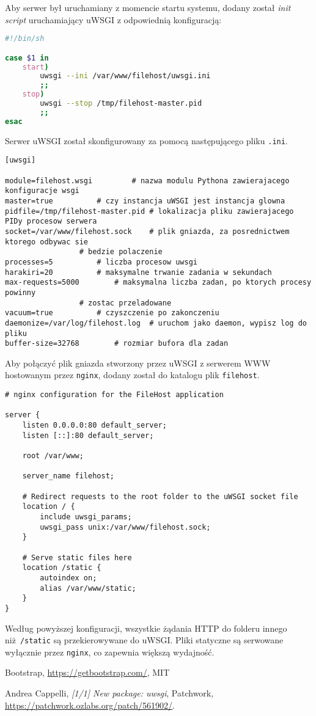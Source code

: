 \documentclass[10pt,a4paper]{article}
\begin{document}
Aby serwer był uruchamiany z momencie startu systemu, dodany został \emph{init script}
uruchamiający uWSGI z odpowiednią konfiguracją:
\begin{lstlisting}[language=bash,caption=Zawartość pliku \directory{/etc/init.d/S49filehost}]
#!/bin/sh

case $1 in
	start)
		uwsgi --ini /var/www/filehost/uwsgi.ini
		;;
	stop)
		uwsgi --stop /tmp/filehost-master.pid
		;;
esac
\end{lstlisting}
Serwer uWSGI został skonfigurowany za pomocą następującego pliku \texttt{.ini}.
\begin{lstlisting}[caption=Zawartość pliku \directory{/var/www/filehost/uwsgi.ini}]
[uwsgi]

module=filehost.wsgi		 # nazwa modulu Pythona zawierajacego konfiguracje wsgi
master=true			 # czy instancja uWSGI jest instancja glowna
pidfile=/tmp/filehost-master.pid # lokalizacja pliku zawierajacego PIDy procesow serwera
socket=/var/www/filehost.sock    # plik gniazda, za posrednictwem ktorego odbywac sie
				 # bedzie polaczenie
processes=5			 # liczba procesow uwsgi
harakiri=20			 # maksymalne trwanie zadania w sekundach
max-requests=5000		 # maksymalna liczba zadan, po ktorych procesy powinny
				 # zostac przeladowane
vacuum=true			 # czyszczenie po zakonczeniu
daemonize=/var/log/filehost.log	 # uruchom jako daemon, wypisz log do pliku
buffer-size=32768		 # rozmiar bufora dla zadan
\end{lstlisting}

Aby połączyć plik gniazda stworzony przez uWSGI z serwerem WWW hostowanym przez \texttt{nginx},
dodany został do katalogu  plik \texttt{filehost}.
\begin{lstlisting}[caption=Zawartość pliku \directory{/etc/nginx/sites-enabled/filehost}]
# nginx configuration for the FileHost application

server {
	listen 0.0.0.0:80 default_server;
	listen [::]:80 default_server;

	root /var/www;

	server_name filehost;

	# Redirect requests to the root folder to the uWSGI socket file
	location / {
		include uwsgi_params;
		uwsgi_pass unix:/var/www/filehost.sock;
	}

	# Serve static files here
	location /static {
		autoindex on;
		alias /var/www/static;
	}
}
\end{lstlisting}
Według powyższej konfiguracji, wszystkie żądania HTTP do folderu innego niż \texttt{/static}
są przekierowywane do uWSGI. Pliki statyczne są serwowane wyłącznie przez \texttt{nginx},
co zapewnia większą wydajność.

\begin{thebibliography}{9}
		Bootstrap,
		\url{https://getbootstrap.com/},
		MIT

		Andrea Cappelli,
		\emph{[1/1] New package: uwsgi},
		Patchwork,
		\url{https://patchwork.ozlabs.org/patch/561902/}.
\end{thebibliography}
\end{document}
